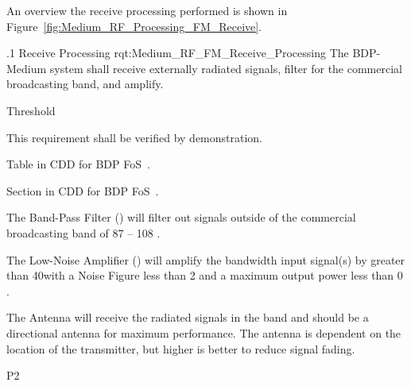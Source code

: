An overview the \FM \RF receive processing performed is shown in Figure~\ref{fig:Medium_RF_Processing_FM_Receive}.


\ONERQMTV
{\RqtNumberBase.1}
{\ThisSubSegment Receive Processing}
{rqt:Medium_RF_FM_Receive_Processing}
{The BDP-Medium system shall receive externally radiated \RF signals, filter for the commercial \FM broadcasting band, and amplify.}
{
	\item [Phase 1] Threshold
}
{This requirement shall be verified by demonstration.}
{
	\item [5.4] Table in CDD for BDP FoS~\cite{ref__BDP_FOS_CDD}.
	\item [5.5.5] Section in CDD for BDP FoS~\cite{ref__BDP_FOS_CDD}.
}
{
	\item The Band-Pass Filter (\BPF) will filter out signals outside of the commercial \FM broadcasting band of 87 – 108 \MHz.
	\item The Low-Noise Amplifier (\LNA) will amplify the \FM bandwidth input signal(s) by greater than 40\dB with a Noise Figure less than 2 \dB and a maximum output power less than 0 \dBm.
	\item The Antenna will receive the radiated \RF signals in the \FM band and should be a directional antenna for maximum performance. The antenna \HAAT is dependent on the location of the transmitter, but higher is better to reduce signal fading.
}
{P2}

